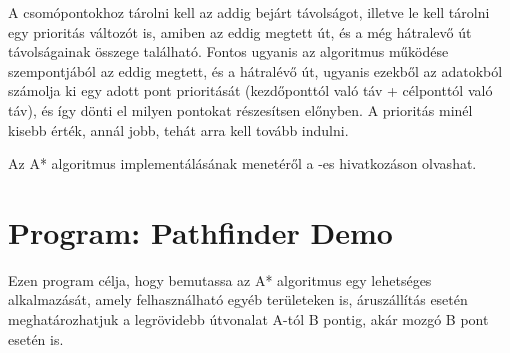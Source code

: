 A csomópontokhoz tárolni kell az addig bejárt távolságot, illetve le kell tárolni egy prioritás változót is, amiben az eddig megtett út, és a még hátralevő út távolságainak összege található. Fontos ugyanis az algoritmus működése szempontjából az eddig megtett, és a hátralévő út, ugyanis ezekből az adatokból számolja ki egy adott pont prioritását (kezdőponttól való táv + célponttól való táv), és így dönti el milyen pontokat részesítsen előnyben. A prioritás minél kisebb érték, annál jobb, tehát arra kell tovább indulni.

Az A* algoritmus implementálásának menetéről a \cite{Astar3}-es hivatkozáson olvashat.


\section{Program: Pathfinder Demo}

Ezen program célja, hogy bemutassa az A* algoritmus egy lehetséges alkalmazását, amely felhasználható egyéb területeken is, áruszállítás esetén meghatározhatjuk a legrövidebb útvonalat A-tól B pontig, akár mozgó B pont esetén is.

